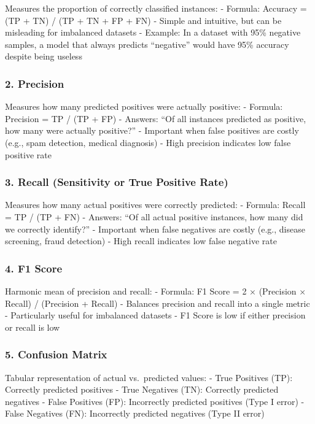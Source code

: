 \documentclass[
  letterpaper,
  DIV=11,
  numbers=noendperiod]{scrreprt}
\begin{document}
Measures the proportion of correctly classified instances: - Formula:
Accuracy = (TP + TN) / (TP + TN + FP + FN) - Simple and intuitive, but
can be misleading for imbalanced datasets - Example: In a dataset with
95\% negative samples, a model that always predicts ``negative'' would
have 95\% accuracy despite being useless

\subsubsection{2. Precision}\label{precision}

Measures how many predicted positives were actually positive: - Formula:
Precision = TP / (TP + FP) - Answers: ``Of all instances predicted as
positive, how many were actually positive?'' - Important when false
positives are costly (e.g., spam detection, medical diagnosis) - High
precision indicates low false positive rate

\subsubsection{3. Recall (Sensitivity or True Positive
Rate)}\label{recall-sensitivity-or-true-positive-rate}

Measures how many actual positives were correctly predicted: - Formula:
Recall = TP / (TP + FN) - Answers: ``Of all actual positive instances,
how many did we correctly identify?'' - Important when false negatives
are costly (e.g., disease screening, fraud detection) - High recall
indicates low false negative rate

\subsubsection{4. F1 Score}\label{f1-score}

Harmonic mean of precision and recall: - Formula: F1 Score = 2 ×
(Precision × Recall) / (Precision + Recall) - Balances precision and
recall into a single metric - Particularly useful for imbalanced
datasets - F1 Score is low if either precision or recall is low

\subsubsection{5. Confusion Matrix}\label{confusion-matrix}

Tabular representation of actual vs.~predicted values: - True Positives
(TP): Correctly predicted positives - True Negatives (TN): Correctly
predicted negatives - False Positives (FP): Incorrectly predicted
positives (Type I error) - False Negatives (FN): Incorrectly predicted
negatives (Type II error)
\end{document}
